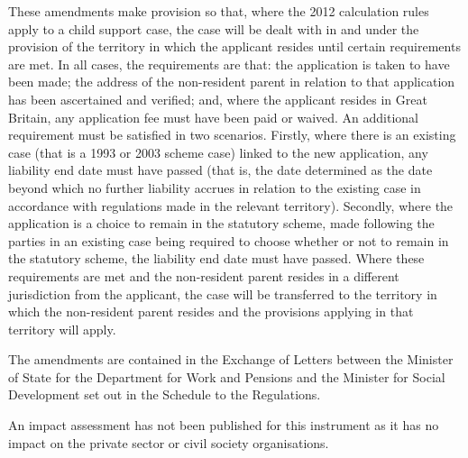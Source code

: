 \documentclass[12pt,a4paper]{article}
\begin{document}
These amendments make provision so that, where the 2012 calculation rules apply to a child support case, the case will be dealt with in and under the provision of the territory in which the applicant resides until certain requirements are met. In all cases, the requirements are that: the application is taken to have been made; the address of the non-resident parent in relation to that application has been ascertained and verified; and, where the applicant resides in Great Britain, any application fee must have been paid or waived. An additional requirement must be satisfied in two scenarios. Firstly, where there is an existing case (that is a 1993 or 2003 scheme case) linked to the new application, any liability end date must have passed (that is, the date determined as the date beyond which no further liability accrues in relation to the existing case in accordance with regulations made in the relevant territory). Secondly, where the application is a choice to remain in the statutory scheme, made following the parties in an existing case being required to choose whether or not to remain in the statutory scheme, the liability end date must have passed. Where these requirements are met and the non-resident parent resides in a different jurisdiction from the applicant, the case will be transferred to the territory in which the non-resident parent resides and the provisions applying in that territory will apply.

The amendments are contained in the Exchange of Letters between the Minister of State for the Department for Work and Pensions and the Minister for Social Development set out in the Schedule to the Regulations.

An impact assessment has not been published for this instrument as it has no impact on the private sector or civil society organisations. 
\end{document}
